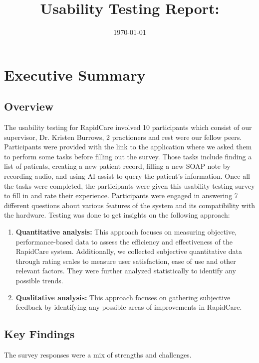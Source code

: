 \documentclass{article}
\title{Usability Testing Report: \progname}
\author{\authname}
\date{\today}
\begin{document}
\newpage

\tableofcontents
\newpage

\section{Executive Summary}

\subsection{Overview}

The usability testing for RapidCare involved 10 participants which consist of our supervisor, Dr. Kristen Burrows, 2 practioners and rest were our fellow peers. Participants were provided with the link to the application where we asked them to perform some tasks before filling out the survey. Those tasks include finding a list of patients, creating a new patient record, filling a new SOAP note by recording audio, and using AI-assist to query the patient's information. Once all the tasks were completed, the participants were given this usability testing survey to fill in and rate their experience. Participants were engaged in answering 7 different questions about various features of the system and its compatibility with the hardware. Testing was done to get insights on the following approach:

\begin{enumerate}
    \item \textbf{Quantitative analysis:} This approach focuses on measuring objective, performance-based data to assess the efficiency and effectiveness of the RapidCare system. Additionally, we collected subjective quantitative data through rating scales to measure user satisfaction, ease of use and other relevant factors. They were further analyzed statistically to identify any possible trends.
    \item \textbf{Qualitative analysis:} This approach focuses on gathering subjective feedback by identifying any possible areas of improvements in RapidCare. 
\end{enumerate}

\subsection{Key Findings}

The survey responses were a mix of strengths and challenges.
\end{document}
